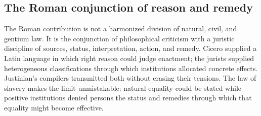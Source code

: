 \subsection{The Roman conjunction of reason and remedy}

The Roman contribution is not a harmonized division of natural, civil, and gentium law. It is the conjunction of philosophical criticism with a juristic discipline of sources, status, interpretation, action, and remedy. Cicero supplied a Latin language in which right reason could judge enactment; the jurists supplied heterogeneous classifications through which institutions allocated concrete effects. Justinian's compilers transmitted both without erasing their tensions. The law of slavery makes the limit unmistakable: natural equality could be stated while positive institutions denied persons the status and remedies through which that equality might become effective.
